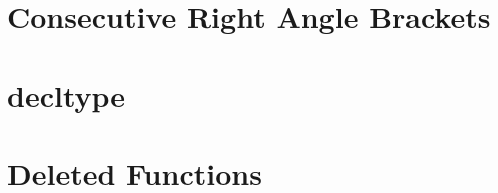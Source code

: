 

\section[Adjacent {\tt >}s\hspace*{1em}(Consecutive Right Angle Brackets)]{Consecutive Right Angle Brackets}\label{consecutive-right-angle-brackets}


\newpage
\section[{\tt decltype}\hspace*{1em}(Long Title)]{{\SecCode decltype}}\label{decltype}


\newpage
\section[Deleted Functions\hspace*{1em}(Long Title)]{Deleted Functions}\label{deleted-functions}


\newpage
